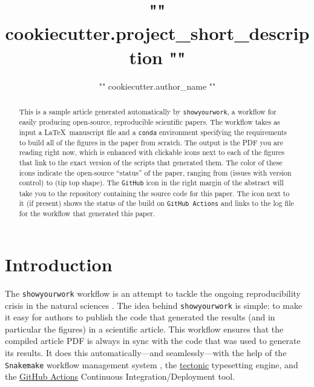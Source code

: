 \documentclass[twocolumn]{aastex631}
\begin{document}
\title{{ "{" }}{{ cookiecutter.project_short_description }}{{ "}" }}

\author{{ "{" }}{{ cookiecutter.author_name }}{{ "}" }}

\begin{abstract}
    This is a sample article generated automatically by \texttt{showyourwork}, a workflow for easily producing open-source, reproducible scientific papers.
    The workflow takes as input a \LaTeX\, manuscript file and a \texttt{conda} environment specifying the requirements to build all of the figures in the paper from scratch.
    The output is the PDF you are reading right now, which is enhanced with clickable icons next to each of the figures that link to the exact version of the scripts that generated them.
    The color of these icons indicate the open-source ``status'' of the paper, ranging from \GitHubIconRed (issues with version control) to \GitHubIconBlue (tip top shape).
    The \texttt{GitHub} icon in the right margin of the abstract will take you to the  repository containing the source code for this paper.
    The icon next to it (if present) shows the status of the build on \texttt{GitHub Actions} and links to the log file for the workflow that generated this paper.
\end{abstract}

\section{Introduction}
The \texttt{showyourwork} workflow is an attempt to tackle the ongoing reproducibility crisis in the natural sciences \citep[see, e.g.,][]{Baker2016}.
The idea behind \texttt{showyourwork} is simple: to make it easy for authors to publish the code that generated the results (and in particular the figures) in a scientific article.
This workflow ensures that the compiled article PDF is always in sync with the code that was used to generate its results.
It does this automatically---and seamlessly---with the help of the \texttt{Snakemake} workflow management system \citep{Molder2021}, the \href{https://github.com/tectonic-typesetting/tectonic}{tectonic} typesetting engine, and the \href{https://github.com/features/actions}{GitHub Actions} Continuous Integration/Deployment tool.
\end{document}
